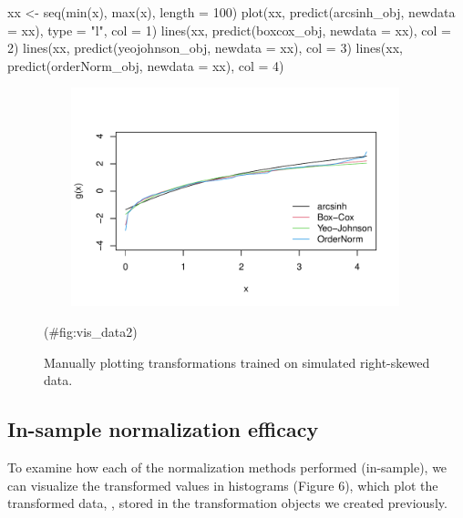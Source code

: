 \begin{Schunk}
\begin{Sinput}
xx <- seq(min(x), max(x), length = 100)
plot(xx, predict(arcsinh_obj, newdata = xx), type = "l", col = 1)
lines(xx, predict(boxcox_obj, newdata = xx), col = 2)
lines(xx, predict(yeojohnson_obj, newdata = xx), col = 3)
lines(xx, predict(orderNorm_obj, newdata = xx), col = 4)
\end{Sinput}
\end{Schunk}

\begin{Schunk}
\begin{figure}

{\centering \includegraphics[width=4.375in,height=2.5in]{figs/vis_data2-1} 

}

\caption[Manually plotting transformations trained on simulated right-skewed data]{Manually plotting transformations trained on simulated right-skewed data.}(\#fig:vis_data2)
\end{figure}
\end{Schunk}

\hypertarget{in-sample-normalization-efficacy}{%
\subsection{In-sample normalization
efficacy}\label{in-sample-normalization-efficacy}}

To examine how each of the normalization methods performed (in-sample),
we can visualize the transformed values in histograms (Figure 6), which
plot the transformed data, , stored in the transformation
objects we created previously.

